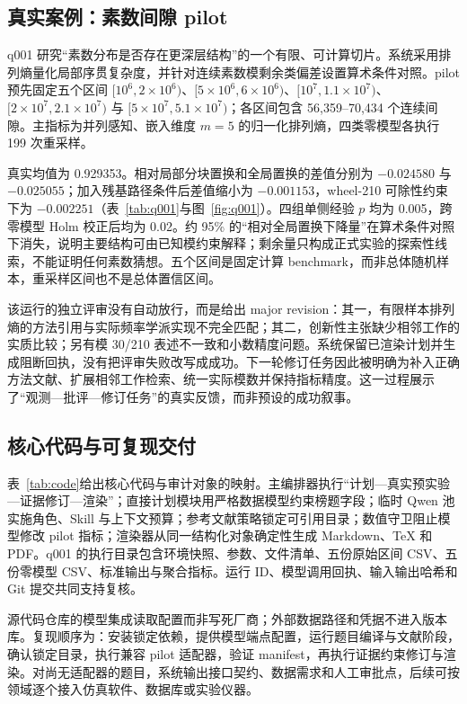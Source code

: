 \documentclass[12pt]{article}
\begin{document}
\subsection*{真实案例：素数间隙 pilot}

q001 研究“素数分布是否存在更深层结构”的一个有限、可计算切片。系统采用排列熵量化局部序贯复杂度\cite{bandtpompe}，并针对连续素数模剩余类偏差设置算术条件对照\cite{lemkeoliver}。pilot 预先固定五个区间 $[10^6,2\times10^6)$、$[5\times10^6,6\times10^6)$、$[10^7,1.1\times10^7)$、$[2\times10^7,2.1\times10^7)$ 与 $[5\times10^7,5.1\times10^7)$；各区间包含 56,359--70,434 个连续间隙。主指标为并列感知、嵌入维度 $m=5$ 的归一化排列熵，四类零模型各执行 199 次重采样。

真实均值为 0.929353。相对局部分块置换和全局置换的差值分别为 $-0.024580$ 与 $-0.025055$；加入残基路径条件后差值缩小为 $-0.001153$，wheel-210 可除性约束下为 $-0.002251$（表~\ref{tab:q001}与图~\ref{fig:q001}）。四组单侧经验 $p$ 均为 0.005，跨零模型 Holm 校正后均为 0.02。约 95\% 的“相对全局置换下降量”在算术条件对照下消失，说明主要结构可由已知模约束解释；剩余量只构成正式实验的探索性线索，不能证明任何素数猜想。五个区间是固定计算 benchmark，而非总体随机样本，重采样区间也不是总体置信区间。

该运行的独立评审没有自动放行，而是给出 major revision：其一，有限样本排列熵的方法引用与实际频率学派实现不完全匹配；其二，创新性主张缺少相邻工作的实质比较；另有模 30/210 表述不一致和小数精度问题。系统保留已渲染计划并生成阻断回执，没有把评审失败改写成成功。下一轮修订任务因此被明确为补入正确方法文献、扩展相邻工作检索、统一实际模数并保持指标精度。这一过程展示了“观测—批评—修订任务”的真实反馈，而非预设的成功叙事。

\subsection*{核心代码与可复现交付}

表~\ref{tab:code}给出核心代码与审计对象的映射。主编排器执行“计划—真实预实验—证据修订—渲染”；直接计划模块用严格数据模型约束榜题字段；临时 Qwen 池实施角色、Skill 与上下文预算；参考文献策略锁定可引用目录；数值守卫阻止模型修改 pilot 指标；渲染器从同一结构化对象确定性生成 Markdown、TeX 和 PDF。q001 的执行目录包含环境快照、参数、文件清单、五份原始区间 CSV、五份零模型 CSV、标准输出与聚合指标。运行 ID、模型调用回执、输入输出哈希和 Git 提交共同支持复核。

源代码仓库的模型集成读取配置而非写死厂商；外部数据路径和凭据不进入版本库。复现顺序为：安装锁定依赖，提供模型端点配置，运行题目编译与文献阶段，确认锁定目录，执行兼容 pilot 适配器，验证 manifest，再执行证据约束修订与渲染。对尚无适配器的题目，系统输出接口契约、数据需求和人工审批点，后续可按领域逐个接入仿真软件、数据库或实验仪器。
\end{document}
